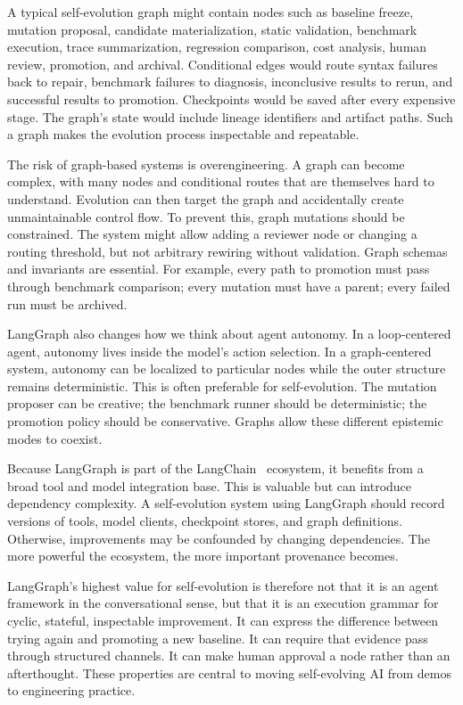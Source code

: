 A typical self-evolution graph might contain nodes such as baseline freeze, mutation proposal, candidate materialization, static validation, benchmark execution, trace summarization, regression comparison, cost analysis, human review, promotion, and archival.  Conditional edges would route syntax failures back to repair, benchmark failures to diagnosis, inconclusive results to rerun, and successful results to promotion.  Checkpoints would be saved after every expensive stage.  The graph's state would include lineage identifiers and artifact paths.  Such a graph makes the evolution process inspectable and repeatable.

The risk of graph-based systems is overengineering.  A graph can become complex, with many nodes and conditional routes that are themselves hard to understand.  Evolution can then target the graph and accidentally create unmaintainable control flow.  To prevent this, graph mutations should be constrained.  The system might allow adding a reviewer node or changing a routing threshold, but not arbitrary rewiring without validation.  Graph schemas and invariants are essential.  For example, every path to promotion must pass through benchmark comparison; every mutation must have a parent; every failed run must be archived.

LangGraph also changes how we think about agent autonomy.  In a loop-centered agent, autonomy lives inside the model's action selection.  In a graph-centered system, autonomy can be localized to particular nodes while the outer structure remains deterministic.  This is often preferable for self-evolution.  The mutation proposer can be creative; the benchmark runner should be deterministic; the promotion policy should be conservative.  Graphs allow these different epistemic modes to coexist.

Because LangGraph is part of the LangChain~\cite{chase2023langchain} ecosystem, it benefits from a broad tool and model integration base.  This is valuable but can introduce dependency complexity.  A self-evolution system using LangGraph should record versions of tools, model clients, checkpoint stores, and graph definitions.  Otherwise, improvements may be confounded by changing dependencies.  The more powerful the ecosystem, the more important provenance becomes.

LangGraph's highest value for self-evolution is therefore not that it is an agent framework in the conversational sense, but that it is an execution grammar for cyclic, stateful, inspectable improvement.  It can express the difference between trying again and promoting a new baseline.  It can require that evidence pass through structured channels.  It can make human approval a node rather than an afterthought.  These properties are central to moving self-evolving AI from demos to engineering practice.

